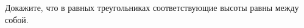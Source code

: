 \begin{ex}
	\begin{condition}
		Докажите, что в равных треугольниках соответствующие высоты равны между собой.
	\end{condition}
\end{ex}
